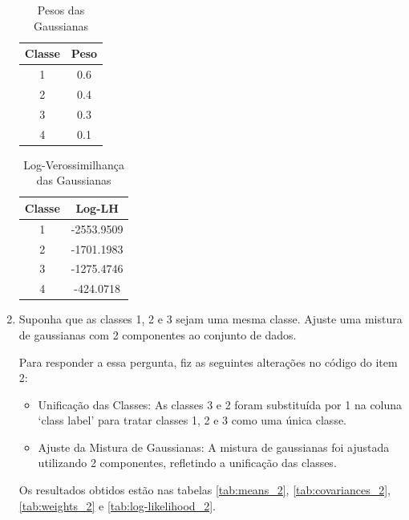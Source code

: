 \begin{enumerate}
\begin{table}[H]
    \centering
    \caption{Pesos das Gaussianas}
    \begin{tabular}{|c|c|}
        \hline
        Classe & Peso \\ \hline
        1 & 0.6 \\ \hline
        2 & 0.4 \\ \hline
        3 & 0.3 \\ \hline
        4 & 0.1 \\ \hline
    \end{tabular}
    \label{tab:weights_3}
\end{table}

\begin{table}[H]
    \centering
    \caption{Log-Verossimilhança das Gaussianas}
    \begin{tabular}{|c|c|}
        \hline
        Classe & Log-LH \\ \hline
        1 & -2553.9509 \\ \hline
        2 & -1701.1983 \\ \hline
        3 & -1275.4746 \\ \hline
        4 & -424.0718 \\ \hline
    \end{tabular}
    \label{tab:log-likelihood_3}
\end{table}


\item Suponha que as classes 1, 2 e 3 sejam uma mesma classe. Ajuste uma mistura de gaussianas com 2 componentes ao conjunto de dados.

\begin{tcolorbox}[colback=white, colframe=black, title=Resposta:]
    Para responder a essa pergunta, fiz as seguintes alterações no código do item 2:
    \begin{itemize}
        \item Unificação das Classes: As classes 3 e 2 foram substituída por 1 na coluna `class label' para tratar classes 1, 2 e 3 como uma única classe.
        \item Ajuste da Mistura de Gaussianas: A mistura de gaussianas foi ajustada utilizando 2 componentes, refletindo a unificação das classes.
    \end{itemize}
Os resultados obtidos estão nas tabelas \ref{tab:means_2}, \ref{tab:covariances_2}, \ref{tab:weights_2} e \ref{tab:log-likelihood_2}.
\end{tcolorbox}


\end{enumerate}
